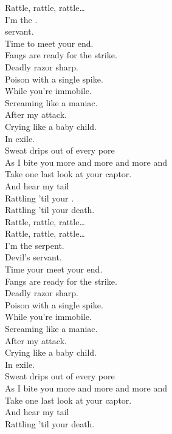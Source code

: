 Rattle, rattle, rattle… \\

I'm the . \\
 servant. \\
Time to meet your end. \\

Fangs are ready for the strike. \\
Deadly razor sharp. \\
Poison with a single spike. \\
While you're immobile. \\

Screaming like a maniac. \\
After my attack. \\
Crying like a baby child. \\
In exile. \\

Sweat drips out of every pore \\
As I bite you more and more and more and \\
Take one last look at your captor. \\
And hear my tail \\
Rattling 'til your . \\

Rattling 'til your death. \\

Rattle, rattle, rattle… \\

Rattle, rattle, rattle… \\

I'm the serpent. \\
Devil's servant. \\
Time your meet your end. \\

Fangs are ready for the strike. \\
Deadly razor sharp. \\
Poison with a single spike. \\
While you're immobile. \\

Screaming like a maniac. \\
After my attack. \\
Crying like a baby child. \\
In exile. \\

Sweat drips out of every pore \\
As I bite you more and more and more and \\
Take one last look at your captor. \\
And hear my tail \\
Rattling 'til your death. \\ \\

